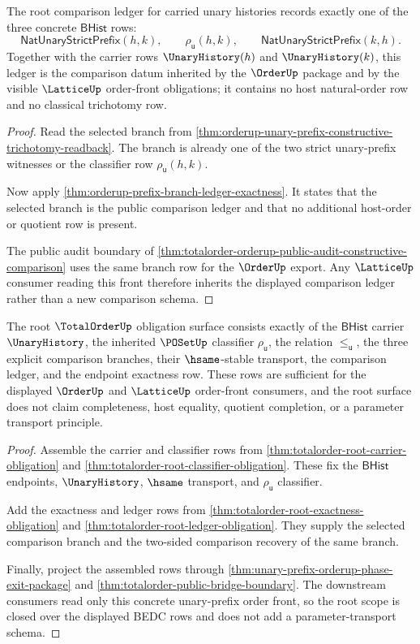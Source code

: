 \begin{theorem}
\label{thm:totalorder-root-ledger-obligation}
The root comparison ledger for carried unary histories records exactly one of
the three concrete $\mathsf{BHist}$ rows:
$$
\mathsf{NatUnaryStrictPrefix}(h,k),
\qquad
\rho_{\mathsf{u}}(h,k),
\qquad
\mathsf{NatUnaryStrictPrefix}(k,h).
$$
Together with the carrier rows $\UnaryHistory(h)$ and $\UnaryHistory(k)$, this
ledger is the comparison datum inherited by the $\OrderUp$ package and by the
visible $\LatticeUp$ order-front obligations; it contains no host natural-order
row and no classical trichotomy row.
\end{theorem}
\begin{proof}
Read the selected branch from
\autoref{thm:orderup-unary-prefix-constructive-trichotomy-readback}. The
branch is already one of the two strict unary-prefix witnesses or the
classifier row $\rho_{\mathsf{u}}(h,k)$.

Now apply \autoref{thm:orderup-prefix-branch-ledger-exactness}. It states that
the selected branch is the public comparison ledger and that no additional
host-order or quotient row is present.

The public audit boundary of
\autoref{thm:totalorder-orderup-public-audit-constructive-comparison} uses the
same branch row for the $\OrderUp$ export. Any $\LatticeUp$ consumer reading
this front therefore inherits the displayed comparison ledger rather than a
new comparison schema.
\end{proof}

\begin{theorem}
\label{thm:totalorder-root-scope-obligation}
The root $\TotalOrderUp$ obligation surface consists exactly of the
$\mathsf{BHist}$ carrier $\UnaryHistory$, the inherited $\POSetUp$ classifier
$\rho_{\mathsf{u}}$, the relation $\le_{\mathsf{u}}$, the three explicit
comparison branches, their $\hsame$-stable transport, the comparison ledger,
and the endpoint exactness row. These rows are sufficient for the displayed
$\OrderUp$ and $\LatticeUp$ order-front consumers, and the root surface does
not claim completeness, host equality, quotient completion, or a parameter
transport principle.
\end{theorem}
\begin{proof}
Assemble the carrier and classifier rows from
\autoref{thm:totalorder-root-carrier-obligation} and
\autoref{thm:totalorder-root-classifier-obligation}. These fix the
$\mathsf{BHist}$ endpoints, $\UnaryHistory$, $\hsame$ transport, and
$\rho_{\mathsf{u}}$ classifier.

Add the exactness and ledger rows from
\autoref{thm:totalorder-root-exactness-obligation} and
\autoref{thm:totalorder-root-ledger-obligation}. They supply the selected
comparison branch and the two-sided comparison recovery of the same branch.

Finally, project the assembled rows through
\autoref{thm:unary-prefix-orderup-phase-exit-package} and
\autoref{thm:totalorder-public-bridge-boundary}. The downstream consumers read
only this concrete unary-prefix order front, so the root scope is closed over
the displayed BEDC rows and does not add a parameter-transport schema.
\end{proof}
